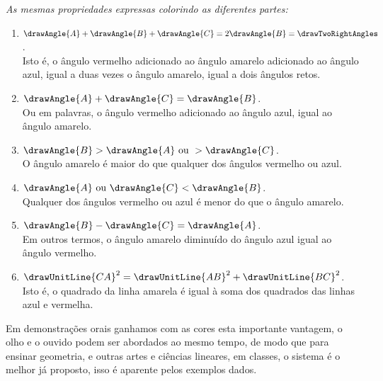 \documentclass[booklanguage=brazilian]{byrnebook}
\begin{document}
\baselineskip

\begin{center}
\emph{As mesmas propriedades expressas colorindo as diferentes partes:}
\end{center}

\baselineskip

\begin{enumerate}
\item $\drawAngle{A} + \drawAngle{B} + \drawAngle{C} = 2 \drawAngle{B} = \drawTwoRightAngles$. \\ Isto é, o ângulo vermelho adicionado ao ângulo amarelo adicionado ao ângulo azul, igual a duas vezes o ângulo amarelo, igual a dois ângulos retos.
\item $\drawAngle{A} + \drawAngle{C} = \drawAngle{B}$. \\ Ou em palavras, o ângulo vermelho adicionado ao ângulo azul, igual ao ângulo amarelo.
\item $\drawAngle{B} > \drawAngle{A} \mbox{ ou } > \drawAngle{C}$. \\ O ângulo amarelo é maior do que qualquer dos ângulos vermelho ou azul.
\item $\drawAngle{A} \mbox{ ou } \drawAngle{C} < \drawAngle{B}$. \\ Qualquer dos ângulos vermelho ou azul é menor do que o ângulo amarelo.
\item $\drawAngle{B} - \drawAngle{C} = \drawAngle{A}$. \\ Em outros termos, o ângulo amarelo diminuído do ângulo azul igual ao ângulo vermelho. %
\item $\drawUnitLine{CA}^2 = \drawUnitLine{AB}^2 + \drawUnitLine{BC}^2$. \\ Isto é, o quadrado da linha amarela é igual à soma dos quadrados das linhas azul e vermelha.
\end{enumerate}

Em demonstrações orais ganhamos com as cores esta importante vantagem, o olho e o ouvido podem ser abordados ao mesmo tempo, de modo que para ensinar geometria, e outras artes e ciências lineares, em classes, o sistema é o melhor já proposto, isso é aparente pelos exemplos dados.

\end{document}
